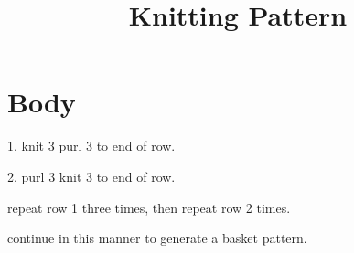 \documentclass[10pt]{article}
\title{Knitting Pattern}
\date{}
\begin{document}
\maketitle

\section*{Body}

1. knit 3 purl 3 to end of row.

2. purl 3 knit 3 to end of row.

repeat row 1 three times, then repeat row 2 times.

continue in this manner to generate a basket pattern.
\end{document}
